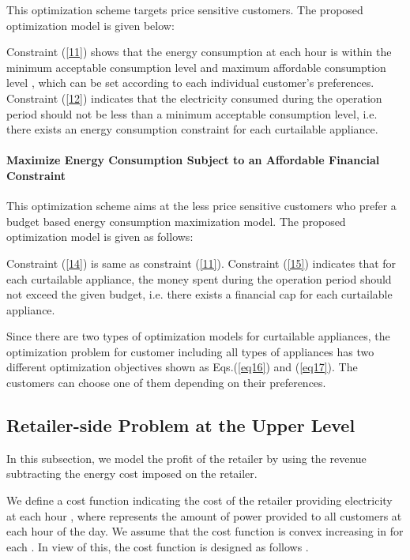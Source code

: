 \documentclass[10pt,journal]{IEEEtran}
\theoremstyle{definition}
\theoremstyle{plain} \newtheorem{theo}{Theorem} \newtheorem{prop}{Proposition}  \newtheorem{lemm}{Lemma}
\begin{document}
This optimization scheme targets price sensitive customers. The proposed optimization model is given below:\vspace{-0.15cm}

Constraint (\ref{11}) shows that the energy consumption at each hour is within the minimum acceptable consumption level   and maximum affordable consumption level , which can be set according to each individual customer's preferences. Constraint (\ref{12}) indicates that the electricity consumed during the operation period should not be less than a minimum acceptable consumption level, i.e. there exists an energy consumption constraint for each curtailable appliance.

\paragraph{Maximize Energy Consumption Subject to an Affordable Financial Constraint}
This optimization scheme aims at the less price sensitive customers who prefer a budget based energy consumption maximization model. The proposed optimization model is given as follows:\vspace{-0.5cm}

   
Constraint (\ref{14}) is same as constraint (\ref{11}). Constraint (\ref{15}) indicates that for each curtailable appliance, the money spent during the operation period should not exceed the given budget, i.e. there exists a financial cap for each curtailable appliance.
 







Since there are two types of optimization models for curtailable appliances, the optimization problem for customer  including all types of appliances has two different optimization objectives shown as Eqs.(\ref{eq16}) and (\ref{eq17}). The customers can choose one of them depending on their preferences. 








\subsection{Retailer-side Problem at the Upper Level}

In this subsection, we model the profit of the retailer by using the revenue subtracting the energy cost imposed on the retailer.

We define a cost function  indicating the cost of the retailer providing electricity at each hour , where   represents the amount of power provided to all customers at each hour of the day. We assume that the cost function  is convex increasing in  for each  \cite{Mohsenian-Rad2010} \cite{Li2011}. In view of this, the cost function is designed as follows \cite{Mohsenian-Rad2010}.
\end{document}

